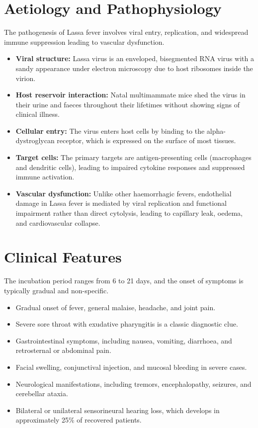 \section*{Aetiology and Pathophysiology}
The pathogenesis of Lassa fever involves viral entry, replication, and widespread immune suppression leading to vascular dysfunction.
\begin{itemize}
    \item \textbf{Viral structure:} Lassa virus is an enveloped, bisegmented RNA virus with a sandy appearance under electron microscopy due to host ribosomes inside the virion.
    \item \textbf{Host reservoir interaction:} Natal multimammate mice shed the virus in their urine and faeces throughout their lifetimes without showing signs of clinical illness.
    \item \textbf{Cellular entry:} The virus enters host cells by binding to the alpha-dystroglycan receptor, which is expressed on the surface of most tissues.
    \item \textbf{Target cells:} The primary targets are antigen-presenting cells (macrophages and dendritic cells), leading to impaired cytokine responses and suppressed immune activation.
    \item \textbf{Vascular dysfunction:} Unlike other haemorrhagic fevers, endothelial damage in Lassa fever is mediated by viral replication and functional impairment rather than direct cytolysis, leading to capillary leak, oedema, and cardiovascular collapse.
\end{itemize}

\section*{Clinical Features}
The incubation period ranges from 6 to 21 days, and the onset of symptoms is typically gradual and non-specific.
\begin{itemize}
    \item Gradual onset of fever, general malaise, headache, and joint pain.
    \item Severe sore throat with exudative pharyngitis is a classic diagnostic clue.
    \item Gastrointestinal symptoms, including nausea, vomiting, diarrhoea, and retrosternal or abdominal pain.
    \item Facial swelling, conjunctival injection, and mucosal bleeding in severe cases.
    \item Neurological manifestations, including tremors, encephalopathy, seizures, and cerebellar ataxia.
    \item Bilateral or unilateral sensorineural hearing loss, which develops in approximately 25\% of recovered patients.
\end{itemize}

